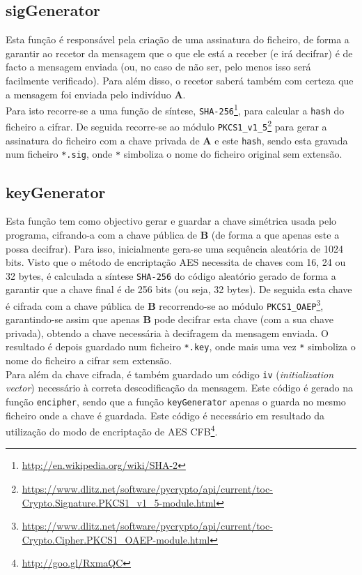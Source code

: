 \documentclass[a4paper,11pt,openright,oneside]{report}
\begin{document}
\subsection{sigGenerator}

Esta função é responsável pela criação de uma assinatura do ficheiro, de forma a garantir ao recetor da mensagem que o que ele está a receber (e irá decifrar) é de facto a mensagem enviada (ou, no caso de não ser, pelo menos isso será facilmente verificado). Para além disso, o recetor saberá também com certeza que a mensagem foi enviada pelo indivíduo \textbf{A}.\\

Para isto recorre-se a uma função de síntese, \verb|SHA-256|\footnote{\url{http://en.wikipedia.org/wiki/SHA-2}}, para calcular a \verb|hash| do ficheiro a cifrar. De seguida recorre-se ao módulo \verb|PKCS1_v1_5|\footnote{\url{https://www.dlitz.net/software/pycrypto/api/current/toc-Crypto.Signature.PKCS1_v1_5-module.html}} para gerar a assinatura do ficheiro com a chave privada de \textbf{A} e este \verb|hash|, sendo esta gravada num ficheiro \verb|*.sig|, onde \verb|*| simboliza o nome do ficheiro original sem extensão.

\subsection{keyGenerator}

Esta função tem como objectivo gerar e guardar a chave simétrica usada pelo programa, cifrando-a com a chave pública de \textbf{B} (de forma a que apenas este a possa decifrar). Para isso, inicialmente gera-se uma sequência aleatória de 1024 bits. Visto que o método de encriptação AES necessita de chaves com 16, 24 ou 32 bytes, é calculada a síntese \verb|SHA-256| do código aleatório gerado de forma a garantir que a chave final é de 256 bits (ou seja, 32 bytes). De seguida esta chave é cifrada com a chave pública de \textbf{B} recorrendo-se ao módulo \verb|PKCS1_OAEP|\footnote{\url{https://www.dlitz.net/software/pycrypto/api/current/toc-Crypto.Cipher.PKCS1_OAEP-module.html}}, garantindo-se assim que apenas \textbf{B} pode decifrar esta chave (com a sua chave privada), obtendo a chave necessária à decifragem da mensagem enviada. O resultado é depois guardado num ficheiro \verb|*.key|, onde mais uma vez \verb|*| simboliza o nome do ficheiro a cifrar sem extensão.\\

Para além da chave cifrada, é também guardado um código \verb|iv| (\textit{initialization vector}) necessário à correta descodificação da mensagem. Este código é gerado na função \verb|encipher|, sendo que a função \verb|keyGenerator| apenas o guarda no mesmo ficheiro onde a chave é guardada. Este código é necessário em resultado da utilização do modo de encriptação de AES CFB\footnote{\url{http://goo.gl/RxmaQC}}.
\end{document}
